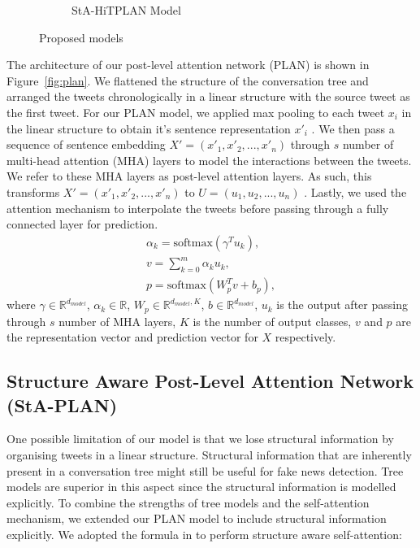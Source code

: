 \documentclass[letterpaper]{article} %
\begin{document}
\begin{figure}
\begin{subfigure}{0.5\columnwidth}
\caption{StA-HiTPLAN Model}
\label{fig:hierachical}
\end{subfigure}
\caption{Proposed models} 
\end{figure}

The architecture of our post-level attention network (PLAN) is shown in Figure~\ref{fig:plan}. We flattened the structure of the conversation tree and arranged the tweets chronologically in a linear structure with the source tweet as the first tweet. For our PLAN model, we applied max pooling to each tweet $x_i$ in the linear structure to obtain it's sentence representation $x'_i$ . We then pass a sequence of sentence embedding $X' = (x'_{1} , x'_{2} , ..., x'_{n})$ through $s$ number of multi-head attention (MHA) layers to model the interactions between the tweets. We refer to these MHA layers as post-level attention layers. As such, this transforms $X' = (x'_{1}, x'_{2}, ..., x'_{n})$ to $U = (u_{1}, u_{2} , ..., u_{n})$ .
Lastly, we used the attention mechanism to interpolate the tweets before passing through a fully connected layer for prediction.
\begin{eqnarray}
\alpha_{k} = \mathrm{softmax}(\gamma^{T}u_{k}), \\
v = \sum_{k = 0}^{m} \alpha_{k}u_{k}, \\
p = \mathrm{softmax}(W_{p}^{T}v + b_{p}),
\end{eqnarray}
where $\gamma \in\mathbb{R}^{d_{model}}$, $\alpha_{k} \in\mathbb{R}$, $W_{p} \in\mathbb{R}^{d_{model}, K}$, $b \in\mathbb{R}^{d_{model}}$, $u_{k}$ is the output after passing through $s$ number of MHA layers, $K$ is the number of output classes, $v$ and $p$ are the representation vector and prediction vector for $X$ respectively.

\subsection{Structure Aware Post-Level Attention Network (StA-PLAN)}
\label{sec:staplan}

One possible limitation of our model is that we lose structural information by organising tweets in a linear structure. Structural information that are inherently present in a conversation tree might still be useful for fake news detection. Tree models are superior in this aspect since the structural information is modelled explicitly. To combine the strengths of tree models and the self-attention mechanism, we extended our PLAN model to include structural information explicitly. We adopted the formula in \citet{shaw-etal-2018-self} to perform structure aware self-attention:
\end{document}
